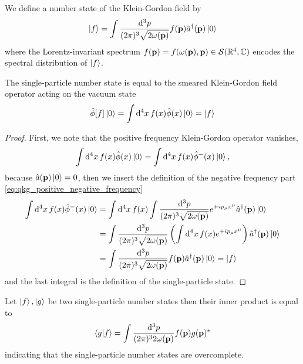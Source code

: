 \begin{definition}\label{def:single_particle_number_state}
	We define a number state of the Klein-Gordon field by
	\begin{equation}
		\ket{f}
		=
		\int\frac{\dd[3]{p}}{(2\pi)^3\sqrt{2\omega(\vb{p})}}
		f(\vb{p})
		\hat{a}^\dagger(\vb{p})
		\ket{0}
	\end{equation}
	where the Lorentz-invariant spectrum $f(\vb{p})=f(\omega(\vb{p}),\vb{p})\in\mathcal{S}(\mathbb{R}^4,\mathbb{C})$ encodes the spectral distribution of $\ket{f}$.
\end{definition}
\begin{lemma}
	The single-particle number state is equal to the smeared Klein-Gordon field operator acting on the vacuum state
	\begin{equation}
		\hat\phi[f]
		\ket{0}
		=
		\int\dd[4]{x}
		f(x)
		\hat\phi(x)
		\ket{0}
		=
		\ket{f}
	\end{equation}
\end{lemma}
\begin{proof}
	First, we note that the positive frequency Klein-Gordon operator vanishes,
	\begin{equation}
		\int\dd[4]{x}
		f(x)
		\hat\phi(x)
		\ket{0}
		=
		\int\dd[4]{x}
		f(x)
		\hat\phi^-(x)
		\ket{0}
		,
	\end{equation}
	because $\hat{a}(\vb{p})\ket{0}=0$, then we insert the definition of the negative frequency part \cref{eq:qkg_positive_negative_frequency}
	\begin{equation}
		\begin{split}
			\int\dd[4]{x}
			f(x)
			\hat\phi^-(x)
			\ket{0}
			&=
			\int\dd[4]{x}
			f(x)
			\int\frac{\dd[3]{p}}{(2\pi)^3\sqrt{2\omega(\vb{p})}}
			e^{+ip_\mu x^\mu}
			\hat{a}^\dagger(\vb{p})
			\ket{0}
			\\
			&=
			\int\frac{\dd[3]{p}}{(2\pi)^3\sqrt{2\omega(\vb{p})}}
			\left(
				\int\dd[4]{x}
				f(x)
				e^{+ip_\mu x^\mu}
			\right)
			\hat{a}^\dagger(\vb{p})
			\ket{0}
			\\
			&=
			\int\frac{\dd[3]{p}}{(2\pi)^3\sqrt{2\omega(\vb{p})}}
			f(\vb{p})
			\hat{a}^\dagger(\vb{p})
			\ket{0}
			=
			\ket{f}
		\end{split}
	\end{equation}
	and the last integral is the definition of the single-particle state.
\end{proof}
\begin{lemma}\label{th:single_particle_number_states_inner_product}
	Let $\ket{f},\ket{g}$ be two single-particle number states then their inner product is equal to
	\begin{equation}
		\braket{g}{f}
		=
		\int\frac{\dd[3]{p}}{(2\pi)^32\omega(\vb{p})}
		f(\vb{p})g(\vb{p})^*
	\end{equation}
	indicating that the single-particle number states are overcomplete.
\end{lemma}
